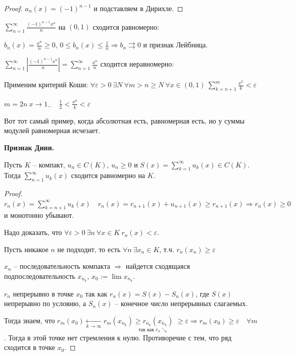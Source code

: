 \begin{proof}
    $a_n(x)=(-1)^{n-1}$ и подставляем в Дирихле.
\end{proof}

\begin{example}
    $\sum\limits_{n=1}^\infty \frac{(-1)^{n-1}x^n}{n}$ на $(0, 1)$ сходится равномерно: 
    
    $b_n(x)=\frac{x^n}{n}\geq 0$, $0\leq b_n(x)\leq \frac{1}{n}\Rightarrow b_n\rightrightarrows 0$ и признак Лейбница.

    $\sum\limits_{n=1}^\infty |\frac{(-1)^{n-1}x^n}{n}|=\sum\limits_{n=1}^\infty\frac{x^n}{n}$ сходится неравномерно: 
    
    Применим критерий Коши: $\forall \varepsilon > 0\ \exists N\ \forall m> n\geq N\ \forall x\in (0, 1)\ \sum\limits_{k=n+1}^m \frac{x^k}{k}<\varepsilon$

    $m=2n\ x\rightarrow 1_-\quad \frac{1}{2}< \frac{x^k}{k}<\varepsilon$

    Вот тот самый пример, когда абсолютная есть, равномерная есть, но у суммы модулей равномерная исчезает.
\end{example}

\begin{theorem}
    \textbf{Признак Дини.}

    Пусть $K$ – компакт, $u_n\in C(K)$, $u_n\geq 0$ и $S(x)=\sum\limits_{k=1}^\infty u_k(x)\in C(K)$. Тогда $\sum\limits_{n=1}^\infty u_k (x)$ сходится равномерно на $K$.
\end{theorem}
\begin{proof}
    $r_n(x)=\sum\limits_{k=n+1}^\infty u_k(x)\quad r_n(x)=r_{n+1}(x)+u_{n+1}(x)\geq r_{n+1}(x)\Rightarrow r_n(x)\geq 0$ и монотонно убывают.

    Надо доказать, что $\forall \varepsilon > 0\ \exists n\ \forall x\in K \ r_n(x) < \varepsilon$.
    
    Пусть никакое $n$ не подходит, то есть $\forall n\ \exists x_n\in K$, т.ч. $r_n(x_n)\geq \varepsilon$

    $x_n$ – последовательность компакта $\Rightarrow$ найдется сходящаяся подпоследовательность $x_{n_k}$, $x_0:=\lim x_{n_k}$.

    $r_n$ непрерывно в точке $x_0$ так как $ r_n(x)=S(x)-S_n(x)$, где $S(x)$ непрерывно по условию, а $S_n(x)$ – конечное число непрерывных слагаемых.

    Тогда знаем, что $r_m(x_0)\underset{k\rightarrow\infty}{\leftarrow} r_m(x_{n_k})\underset{\text{так как } r_n\searrow}{\geq r_{n_k}(x_{n_k})}$ $\geq \varepsilon\Rightarrow r_m(x_0)\geq \varepsilon\quad \forall m$. Тогда в этой точке нет стремления к нулю. Противоречие с тем, что ряд сходится в точке $x_0$.
\end{proof}